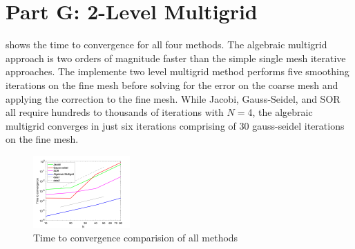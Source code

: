 \documentclass[reqno, 12pt]{amsart}
\begin{document}
    \section{Part G: 2-Level Multigrid}
    \noindent{} shows the time to convergence for all four methods.
    The algebraic multigrid approach is two orders of magnitude faster than the simple single mesh iterative approaches.
    The implemente two level multigrid method performs five smoothing iterations on the fine mesh before solving for the error on the coarse mesh and applying the correction to the fine mesh.
    While Jacobi, Gauss-Seidel, and SOR all require hundreds to thousands of iterations with $N=$4, the algebraic multigrid converges in just six iterations comprising of 30 gauss-seidel iterations on the fine mesh.
    \begin{figure}
        \centering
        \includegraphics[width=0.33\textwidth]{partG.png}
        \caption{Time to convergence comparision of all methods}
        \label{fig:G}
    \end{figure}
\end{document}

